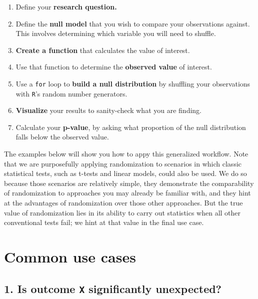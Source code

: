\documentclass[
]{book}
\begin{document}
\begin{enumerate}
\def\labelenumi{\arabic{enumi}.}
\item
  Define your \textbf{research question.}
\item
  Define the \textbf{null model} that you wish to compare your observations against. This involves determining which variable you will need to shuffle.
\item
  \textbf{Create a function} that calculates the value of interest.
\item
  Use that function to determine the \textbf{observed value} of interest.
\item
  Use a \texttt{for} loop to \textbf{build a null distribution} by shuffling your observations with \texttt{R}'s random number generators.
\item
  \textbf{Visualize} your results to sanity-check what you are finding.
\item
  Calculate your \textbf{p-value}, by asking what proportion of the null distribution falls below the observed value.
\end{enumerate}

The examples below will show you how to appy this generalized workflow. Note that we are purposefully applying randomization to scenarios in which classic statistical tests, such as t-tests and linear models, could also be used. We do so because those scenarios are relatively simple, they demonstrate the comparability of randomization to approaches you may already be familiar with, and they hint at the advantages of randomization over those other approaches. But the true value of randomization lies in its ability to carry out statistics when all other conventional tests fail; we hint at that value in the final use case.

\hypertarget{common-use-cases}{%
\section*{Common use cases}\label{common-use-cases}}

\hypertarget{is-outcome-x-significantly-unexpected}{%
\subsection*{\texorpdfstring{1. Is outcome \texttt{X} significantly unexpected?}{1. Is outcome X significantly unexpected?}}\label{is-outcome-x-significantly-unexpected}}
\end{document}
